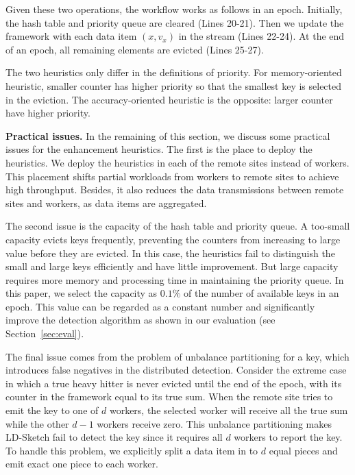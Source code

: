 Given these two operations, the workflow works as follows in an epoch. 
Initially, the hash table and priority queue are cleared (Lines 20-21).
Then we update the framework with each data item $(x, v_x)$ in the stream (Lines 22-24).
At the end of an epoch, all remaining elements are evicted (Lines 25-27).

The two heuristics only differ in the definitions of priority.
For memory-oriented heuristic, smaller counter has higher priority
so that the smallest key is selected in the eviction.
The accuracy-oriented heuristic is the opposite:
larger counter have higher priority.

{\bf Practical issues.} In the remaining of this section, we discuss some practical issues for the enhancement heuristics.
The first is the place to deploy the heuristics.
We deploy the heuristics in each of the remote sites instead of workers.
This placement shifts partial workloads from workers to remote sites to achieve high throughput.
Besides, it also reduces the data transmissions between remote sites and workers,
as data items are aggregated.

The second issue is the capacity of the hash table and priority queue.
A too-small capacity evicts keys frequently, preventing the counters from increasing to large value before they are evicted.
In this case, the heuristics fail to distinguish the small and large keys efficiently and have little improvement.
But large capacity requires more memory and processing time in maintaining the priority queue.
In this paper, we select the capacity as $0.1\%$ of the number of available keys in an epoch.
This value can be regarded as a constant number and significantly improve the detection algorithm as shown in our evaluation (see Section~\ref{sec:eval}).

The final issue comes from the problem of unbalance partitioning for a key,
which introduces false negatives in the distributed detection.
Consider the extreme case in which a true heavy hitter is never evicted until the end of the epoch,
with its counter in the framework equal to its true sum.
When the remote site tries to emit the key to one of $d$ workers, the selected worker will receive all the true sum while the other $d-1$ workers receive zero.
This unbalance partitioning makes LD-Sketch fail to detect the key since it requires all $d$ workers to report the key.
To handle this problem, we explicitly split a data item in to $d$ equal pieces and emit exact one piece to each worker.

